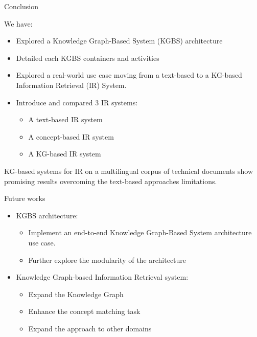 \begin{frame}{Conclusion}

    We have:
    \begin{itemize}
        \item Explored a Knowledge Graph-Based System (KGBS) architecture
        \item Detailed each KGBS containers and activities
        \item Explored a real-world use case moving from a text-based to a KG-based Information Retrieval (IR) System.
        \item Introduce and compared $3$ IR systems:
        \begin{itemize}
            \item A text-based IR system
            \item A concept-based IR system
            \item A KG-based IR system
        \end{itemize}
    \end{itemize}

     \begin{center}
        KG-based systems for IR on a multilingual corpus of technical documents show promising results overcoming the text-based approaches limitations.   
     \end{center}

\end{frame}

\begin{frame}{Future works}

    \begin{itemize}
        \item KGBS architecture:
        \begin{itemize}
            \item Implement an end-to-end Knowledge Graph-Based System architecture use case.
            \item Further explore the modularity of the architecture
        \end{itemize}
        \item Knowledge Graph-based Information Retrieval system:
        \begin{itemize}
            \item Expand the Knowledge Graph
            \item Enhance the concept matching task
            \item Expand the approach to other domains
        \end{itemize}
    \end{itemize}

\end{frame}

